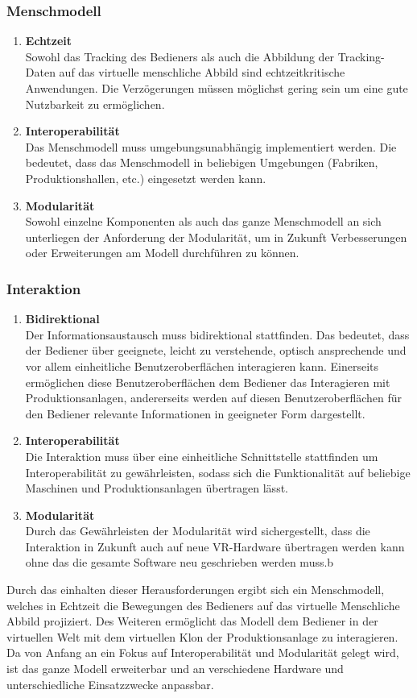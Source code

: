 \subsubsection{Menschmodell}
\begin{enumerate}
	\item \textbf{Echtzeit} \\
	Sowohl das Tracking des Bedieners als auch die Abbildung der Tracking-Daten auf das virtuelle menschliche Abbild sind echtzeitkritische Anwendungen. Die Verzögerungen müssen möglichst gering sein um eine gute Nutzbarkeit zu ermöglichen.
	\item \textbf{Interoperabilität} \\
	Das Menschmodell muss umgebungsunabhängig implementiert werden. Die bedeutet, dass das Menschmodell in beliebigen Umgebungen (Fabriken, Produktionshallen, etc.) eingesetzt werden kann.
	\item \textbf{Modularität} \\
	Sowohl einzelne Komponenten als auch das ganze Menschmodell an sich unterliegen der Anforderung der Modularität, um in Zukunft Verbesserungen oder Erweiterungen am Modell durchführen zu können.
\end{enumerate}

\subsubsection{Interaktion}
\begin{enumerate}
	\item \textbf{Bidirektional} \\
	Der Informationsaustausch muss bidirektional stattfinden. Das bedeutet, dass der Bediener über geeignete, leicht zu verstehende, optisch ansprechende und vor allem einheitliche Benutzeroberflächen interagieren kann. Einerseits ermöglichen diese Benutzeroberflächen dem Bediener das Interagieren mit Produktionsanlagen, andererseits werden auf diesen Benutzeroberflächen für den Bediener relevante Informationen in geeigneter Form dargestellt.
	\item \textbf{Interoperabilität} \\
	Die Interaktion muss über eine einheitliche Schnittstelle stattfinden um Interoperabilität zu gewährleisten, sodass sich die Funktionalität auf beliebige Maschinen und Produktionsanlagen übertragen lässt.
	\item \textbf{Modularität} \\
	Durch das Gewährleisten der Modularität wird sichergestellt, dass die Interaktion in Zukunft auch auf neue VR-Hardware übertragen werden kann ohne das die gesamte Software neu geschrieben werden muss.b
\end{enumerate}
Durch das einhalten dieser Herausforderungen ergibt sich ein Menschmodell, welches in Echtzeit die Bewegungen des Bedieners auf das virtuelle Menschliche Abbild projiziert. Des Weiteren ermöglicht das Modell dem Bediener in der virtuellen Welt mit dem virtuellen Klon der Produktionsanlage zu interagieren. Da von Anfang an ein Fokus auf Interoperabilität und Modularität gelegt wird, ist das ganze Modell erweiterbar und an verschiedene Hardware und unterschiedliche Einsatzzwecke anpassbar.

